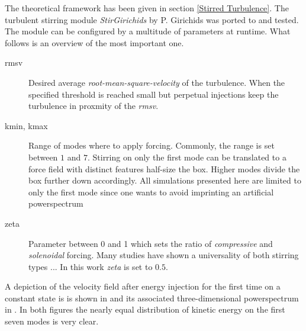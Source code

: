 The theoretical framework has been given in section \ref{Stirred Turbulence}. The turbulent
stirring module \emph{StirGirichids} by P. Girichids was ported to \FLEXI and tested. The
module can be configured by a multitude of parameters at runtime. What follows is an overview
of the most important one.
\begin{description}
    \item [rmsv] Desired average \emph{root-mean-square-velocity} of the turbulence. When the
            specified threshold is reached small but perpetual injections keep the turbulence
            in proxmity of the \emph{rmsv}.
    \item [kmin, kmax] Range of modes where to apply forcing. Commonly, the range
            is set between $1$ and $7$. Stirring on only the first mode can be translated to a
            force field with distinct features half-size the box. Higher modes divide the box further
            down accordingly. All simulations presented here are limited to only the
            first mode since one wants to avoid imprinting an artificial powerspectrum
    \item [zeta] Parameter between 0 and 1 which sets the ratio of \emph{compressive} and \emph{solenoidal}
            forcing. Many studies have shown a universality of both stirring types ...
            In this work \emph{zeta} is set to $0.5$.
\end{description}
A depiction of the velocity field after energy injection for the first time on
a constant state is is shown in  and its associated
three-dimensional powerspectrum in . In
both figures the nearly equal distribution of kinetic energy on the first seven modes
is very clear.

